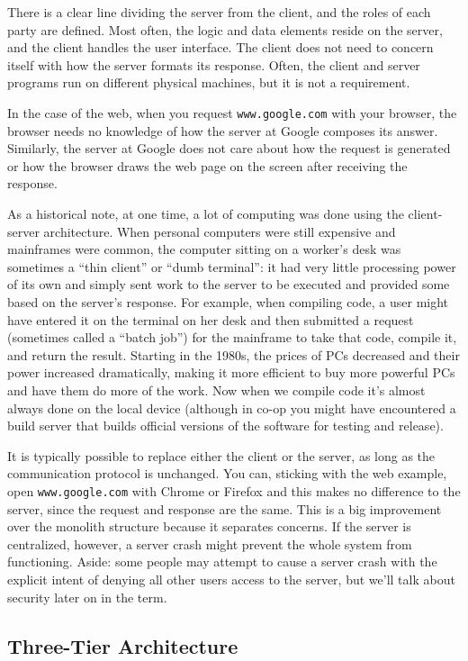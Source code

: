 There is a clear line dividing the server from the client, and the roles of each party are defined. Most often, the logic and data elements reside on the server, and the client handles the user interface. The client does not need to concern itself with how the server formats its response. Often, the client and server programs run on different physical machines, but it is not a requirement. 

In the case of the web, when you request \texttt{www.google.com} with your browser, the browser needs no knowledge of how the server at Google composes its answer. Similarly, the server at Google does not care about how the request is generated or how the browser draws the web page on the screen after receiving the response. 

As a historical note, at one time, a lot of computing was done using the client-server architecture. When personal computers were still expensive and mainframes were common, the computer sitting on a worker's desk was sometimes a ``thin client'' or ``dumb terminal'': it had very little processing power of its own and simply sent work to the server to be executed and provided some based on the server's response. For example, when compiling code, a user might have entered it on the terminal on her desk and then submitted a request (sometimes called a ``batch job'') for the mainframe to take that code, compile it, and return the result. Starting in the 1980s, the prices of PCs decreased and their power increased dramatically, making it more efficient to buy more powerful PCs and have them do more of the work. Now when we compile code it's almost always done on the local device (although in co-op you might have encountered a build server that builds official versions of the software for testing and release). 

It is typically possible to replace either the client or the server, as long as the communication protocol is unchanged. You can, sticking with the web example, open \texttt{www.google.com} with Chrome or Firefox and this makes no difference to the server, since the request and response are the same. This is a big improvement over the monolith structure because it separates concerns. If the server is centralized, however, a server crash might prevent the whole system from functioning. Aside: some people may attempt to cause a server crash with the explicit intent of denying all other users access to the server, but we'll talk about security later on in the term.


\subsection*{Three-Tier Architecture}

